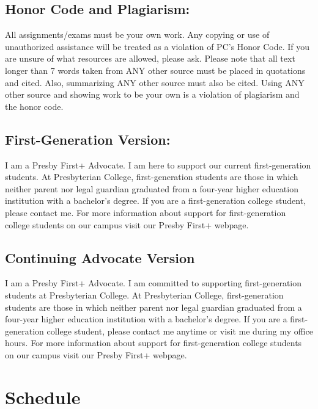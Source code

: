\documentclass[
]{book}
\begin{document}
\hypertarget{honor-code-and-plagiarism}{%
\section{Honor Code and Plagiarism:}\label{honor-code-and-plagiarism}}

All assignments/exams must be your own work. Any copying or use of unauthorized assistance will be treated as a violation of PC's Honor Code. If you are unsure of what resources are allowed, please ask. Please note that all text longer than 7 words taken from ANY other source must be placed in quotations and cited. Also, summarizing ANY other source must also be cited. Using ANY other source and showing work to be your own is a violation of plagiarism and the honor code.

\hypertarget{first-generation-version}{%
\section{First-Generation Version:}\label{first-generation-version}}

I am a Presby First+ Advocate. I am here to support our current first-generation students. At Presbyterian College, first-generation students are those in which neither parent nor legal guardian graduated from a four-year higher education institution with a bachelor's degree. If you are a first-generation college student, please contact me. For more information about support for first-generation college students on our campus visit our Presby First+ webpage.

\hypertarget{continuing-advocate-version}{%
\section{Continuing Advocate Version}\label{continuing-advocate-version}}

I am a Presby First+ Advocate. I am committed to supporting first-generation students at Presbyterian College. At Presbyterian College, first-generation students are those in which neither parent nor legal guardian graduated from a four-year higher education institution with a bachelor's degree. If you are a first-generation college student, please contact me anytime or visit me during my office hours. For more information about support for first-generation college students on our campus visit our Presby First+ webpage.

\hypertarget{schedule}{%
\chapter{Schedule}\label{schedule}}
\end{document}
